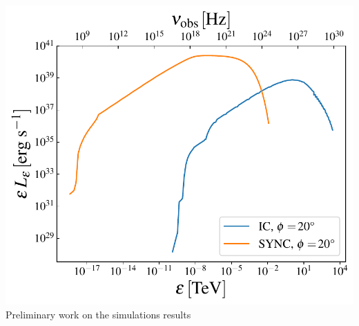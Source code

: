 \begin{frame}
\begin{columns}
{\begin{column}{0.6\textwidth}
			\includegraphics[width=.8\linewidth]{images/eled_ic_sync_hr.pdf}
			\centering
				{\scriptsize Preliminary work on the simulations results}

		\end{column}}
	\end{columns}
\end{frame}


